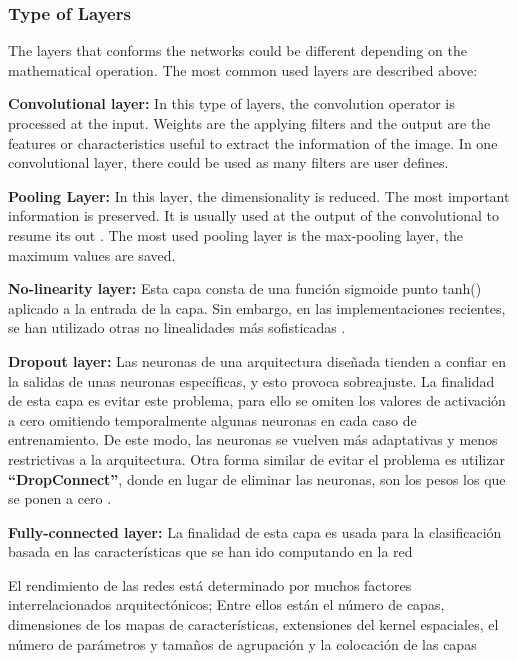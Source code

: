 \subsubsection{Type of Layers}
The layers that conforms the networks could be different depending on the mathematical operation. The most common used layers are described above:
\begin{description}[noitemsep,topsep=8pt,parsep=0pt,partopsep=20pt]
	\item \textbf{Convolutional layer:} In this type of layers, the convolution operator is processed at the input. Weights are the applying filters and the output are the features or characteristics useful to extract the information of the image. In one convolutional layer, there could be used as many filters are user defines.
	\item \textbf{Pooling Layer:} In this layer, the dimensionality is reduced. The most important information is preserved. It is usually used at the output of the convolutional to resume its out \cite{Doorn}. The most used pooling layer is the max-pooling layer, the maximum values are saved.
	\item \textbf{No-linearity layer: } Esta capa consta de una función sigmoide punto tanh() aplicado a la entrada de la capa. Sin embargo, en las implementaciones recientes, se han utilizado otras no linealidades más sofisticadas \cite{Lecum3, Doorn}.
	\item \textbf{Dropout layer:} Las neuronas de una arquitectura diseñada tienden a confiar en la salidas de unas neuronas específicas, y esto provoca sobreajuste. La finalidad de esta capa es evitar este problema, para ello se omiten los valores de activación a cero omitiendo temporalmente algunas neuronas en cada caso de entrenamiento. De este modo, las neuronas se vuelven más adaptativas y menos restrictivas a la arquitectura. Otra forma similar de evitar el problema es utilizar \textbf{``DropConnect''}, donde en lugar de eliminar las neuronas, son los pesos los que se ponen a cero \cite{Doorn}.\\
	\item  \textbf{Fully-connected layer:} La finalidad de esta capa es usada para la clasificación basada en las características que se han ido computando en la red %
\end{description}

El rendimiento de las redes está determinado por muchos factores interrelacionados arquitectónicos; Entre ellos están el número de capas, dimensiones de los mapas de características, extensiones del kernel espaciales, el número de parámetros y tamaños de agrupación y la colocación de las capas %

